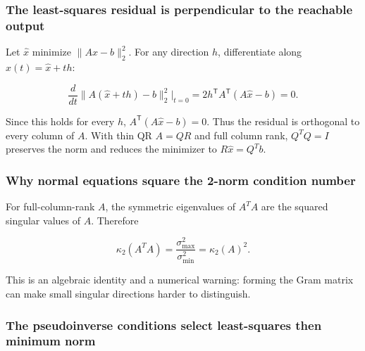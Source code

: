 \subsubsection{The least-squares residual is perpendicular to the reachable output}\label{02-foundations-ii-ch039-the-least-squares-residual-is-perpendicular-to-the-reachable-output}

\hypertarget{02-foundations-ii-ch039-the-least-squares-residual-is-perpendicular-to-the-reachable-output}{}

Let \(\widehat x\) minimize \(\|Ax-b\|_2^2\). For any direction \(h\), differentiate along \(x(t)=\widehat x+th\):

\[
\frac{d}{dt}\|A(\widehat x+th)-b\|_2^2\bigg|_{t=0}
=2h^\mathsf T A^\mathsf T(A\widehat x-b)=0.
\]

Since this holds for every \(h\), \(A^\mathsf T(A\widehat x-b)=0\). Thus the residual is orthogonal to every column of \(A\). With thin QR \(A=QR\) and full column rank, \(Q^TQ=I\) preserves the norm and reduces the minimizer to \(R\widehat x=Q^Tb\).

\subsubsection{Why normal equations square the 2-norm condition number}\label{02-foundations-ii-ch039-why-normal-equations-square-the-2-norm-condition-number}

\hypertarget{02-foundations-ii-ch039-why-normal-equations-square-the-2-norm-condition-number}{}

For full-column-rank \(A\), the symmetric eigenvalues of \(A^TA\) are the squared singular values of \(A\). Therefore

\[
\kappa_2(A^TA)=\frac{\sigma_{\max}^2}{\sigma_{\min}^2}=\kappa_2(A)^2.
\]

This is an algebraic identity and a numerical warning: forming the Gram matrix can make small singular directions harder to distinguish.

\subsubsection{The pseudoinverse conditions select least-squares then minimum norm}\label{02-foundations-ii-ch039-the-pseudoinverse-conditions-select-least-squares-then-minimum-norm}

\hypertarget{02-foundations-ii-ch039-the-pseudoinverse-conditions-select-least-squares-then-minimum-norm}{}


